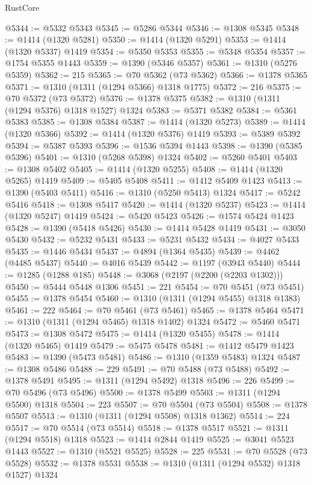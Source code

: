 \begin{lexlean}{RustCore}
\begin{coremodule}
@5344 := @5332 @5343
@5345 := @5286 @5344
@5346 := @1308 @5345
@5348 := @1414 (@1320 @5281)
@5350 := @1414 (@1320 @5291)
@5353 := @1414 (@1320 @5337) @1419
@5354 := @5350 @5353
@5355 := @5348 @5354
@5357 := @1754 @5355 @1443
@5359 := @1390 (@5346 @5357)
@5361 := @1310 (@5276 @5359)
@5362 := 215
@5365 := @70 @5362 (@73 @5362)
@5366 := @1378 @5365
@5371 := @1310 (@1311 (@1294 @5366) @1318 @1775)
@5372 := 216
@5375 := @70 @5372 (@73 @5372)
@5376 := @1378 @5375
@5382 := @1310 (@1311 (@1294 @5376) @1318 @1527) @1324
@5383 := @5371 @5382
@5384 := @5361 @5383
@5385 := @1308 @5384
@5387 := @1414 (@1320 @5273)
@5389 := @1414 (@1320 @5366)
@5392 := @1414 (@1320 @5376) @1419
@5393 := @5389 @5392
@5394 := @5387 @5393
@5396 := @1536 @5394 @1443
@5398 := @1390 (@5385 @5396)
@5401 := @1310 (@5268 @5398) @1324
@5402 := @5260 @5401
@5403 := @1308 @5402
@5405 := @1414 (@1320 @5255)
@5408 := @1414 (@1320 @5265) @1419
@5409 := @5405 @5408
@5411 := @1412 @5409 @1423
@5413 := @1390 (@5403 @5411)
@5416 := @1310 (@5250 @5413) @1324
@5417 := @5242 @5416
@5418 := @1308 @5417
@5420 := @1414 (@1320 @5237)
@5423 := @1414 (@1320 @5247) @1419
@5424 := @5420 @5423
@5426 := @1574 @5424 @1423
@5428 := @1390 (@5418 @5426)
@5430 := @1414 @5428 @1419
@5431 := @3050 @5430
@5432 := @5232 @5431
@5433 := @5231 @5432
@5434 := @4027 @5433
@5435 := @1446 @5434
@5437 := @4894 (@1364 @5435)
@5439 := @4462 (@4485 @5437)
@5440 := @4016 @5439
@5442 := @1197 (@3943 @5440)
@5444 := @1285 (@1288 @185)
@5448 := @3068 (@2197 (@2200 (@2203 @1302)))
@5450 := @5444 @5448 @1306
@5451 := 221
@5454 := @70 @5451 (@73 @5451)
@5455 := @1378 @5454
@5460 := @1310 (@1311 (@1294 @5455) @1318 @1383)
@5461 := 222
@5464 := @70 @5461 (@73 @5461)
@5465 := @1378 @5464
@5471 := @1310 (@1311 (@1294 @5465) @1318 @1402) @1324
@5472 := @5460 @5471
@5473 := @1308 @5472
@5475 := @1414 (@1320 @5455)
@5478 := @1414 (@1320 @5465) @1419
@5479 := @5475 @5478
@5481 := @1412 @5479 @1423
@5483 := @1390 (@5473 @5481)
@5486 := @1310 (@1359 @5483) @1324
@5487 := @1308 @5486
@5488 := 229
@5491 := @70 @5488 (@73 @5488)
@5492 := @1378 @5491
@5495 := @1311 (@1294 @5492) @1318
@5496 := 226
@5499 := @70 @5496 (@73 @5496)
@5500 := @1378 @5499
@5503 := @1311 (@1294 @5500) @1318
@5504 := 223
@5507 := @70 @5504 (@73 @5504)
@5508 := @1378 @5507
@5513 := @1310 (@1311 (@1294 @5508) @1318 @1362)
@5514 := 224
@5517 := @70 @5514 (@73 @5514)
@5518 := @1378 @5517
@5521 := @1311 (@1294 @5518) @1318
@5523 := @1414 @2844 @1419
@5525 := @3041 @5523 @1443
@5527 := @1310 (@5521 @5525)
@5528 := 225
@5531 := @70 @5528 (@73 @5528)
@5532 := @1378 @5531
@5538 := @1310 (@1311 (@1294 @5532) @1318 @1527) @1324

\end{coremodule}
\end{lexlean}
